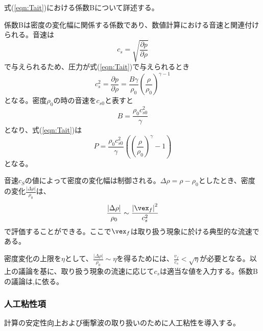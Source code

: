 \documentclass[]{jsarticle}
\begin{document}
式(\ref{eqn:Tait})における係数Bについて詳述する。

係数Bは密度の変化幅に関係する係数であり、数値計算における音速と関連付けられる。音速は
\begin{equation}
c_s=\sqrt{\frac{\partial p}{\partial \rho}}
\end{equation}
で与えられるため、圧力が式(\ref{eqn:Tait})で与えられるとき
\begin{equation}
c_s^2=\frac{\partial p}{\partial \rho}=\frac{B\gamma}{\rho_0}\left(\frac{\rho}{\rho_0}\right)^{\gamma -1}
\end{equation}
となる。密度$\rho_0$の時の音速を$c_{s0}$と表すと
\begin{equation}
B=\frac{\rho_0c_{s0}^2}{\gamma}
\end{equation}
となり、式(\ref{eqn:Tait})は
\begin{equation}
P=\frac{\rho_0c_{s0}^2}{\gamma}\left(\left(\frac{\rho}{\rho_0}\right)^\gamma-1\right)
\end{equation}
となる。

音速$c_S$の値によって密度の変化幅は制御される。$\Delta \rho=\rho-\rho_0$としたとき、密度の変化$\frac{\left| \Delta \rho \right|}{\rho_0}$は、
\begin{equation}
\frac{\left| \Delta \rho \right|}{\rho_0}\sim \frac{\left| \vex_f \right|^2}{c_s^2}
\end{equation}
で評価することができる。ここで$\vex_f$は取り扱う現象に於ける典型的な流速である。

密度変化の上限を$\eta$として、$\frac{\left| \Delta \rho \right|}{\rho_0}\sim \eta$を得るためには、$\frac{v_f}{c_s}<\sqrt{\eta}$が必要となる。以上の議論を基に、取り扱う現象の流速に応じて$c_s$は適当な値を入力する。係数Bの議論は\cite{Becker2007},\cite{Gotoh2018}に依る。


\subsubsection{人工粘性項}
計算の安定性向上および衝撃波の取り扱いのために人工粘性を導入する。
\end{document}
